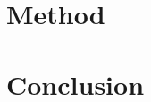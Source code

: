 \documentclass{scrartcl}
\begin{document}
\section{Method}

\section{Conclusion} 










%


\end{document}
